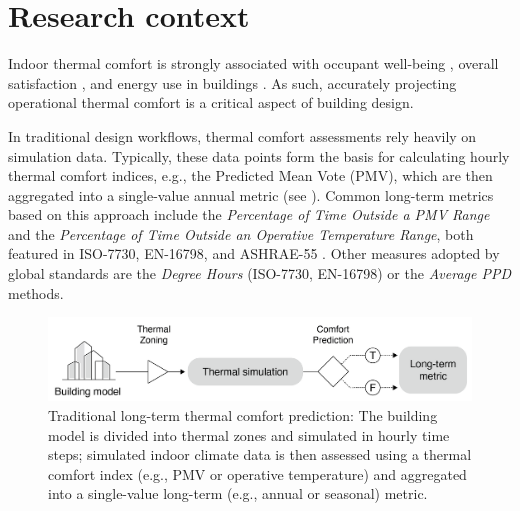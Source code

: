 
\section{Research context}

Indoor thermal comfort is strongly associated with occupant well-being \citep{altomonte_ten_2020}, overall satisfaction \citep{graham_lessons_2021}, and energy use in buildings \citep{yang_thermal_2014}. As such, accurately projecting operational thermal comfort is a critical aspect of building design.

In traditional design workflows, thermal comfort assessments rely heavily on simulation data. Typically, these data points form the basis for calculating hourly thermal comfort indices, e.g., the Predicted Mean Vote (PMV), which are then aggregated into a single-value annual metric (see ). Common long-term metrics based on this approach include the \textit{Percentage of Time Outside a PMV Range} and the \textit{Percentage of Time Outside an Operative Temperature Range}, both featured in ISO-7730, EN-16798, and ASHRAE-55 \citep{iso_2005, cen_en_2019, ashrae_2023}. Other measures adopted by global standards are the \textit{Degree Hours} (ISO-7730, EN-16798) or the \textit{Average PPD} \citep{iso_2005} methods. 


\begin{figure}[h!]
    \centering
    \includegraphics[width=\textwidth]{manuscript/src/figures/workflow-black-short.png}
    \caption{Traditional long-term thermal comfort prediction: The building model is divided into thermal zones and simulated in hourly time steps; simulated indoor climate data is then assessed using a thermal comfort index (e.g., PMV or operative temperature) and aggregated into a single-value long-term (e.g., annual or seasonal) metric. }
    \label{fig:typical-workflow}
\end{figure}



